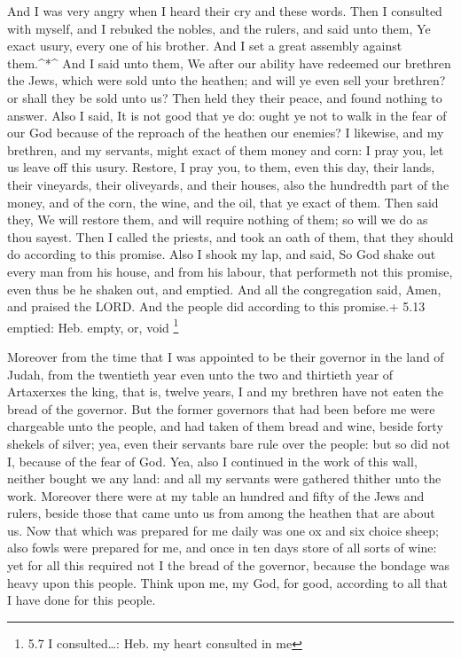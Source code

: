  And I was very angry when I heard their cry and these
words.  Then I consulted with myself, and I rebuked the
nobles, and the rulers, and said unto them, Ye exact usury, every one of
his brother. And I set a great assembly against them.\^{}*\^{}
 And I said unto them, We after our ability have redeemed
our brethren the Jews, which were sold unto the heathen; and will ye
even sell your brethren? or shall they be sold unto us? Then held they
their peace, and found nothing to answer.  Also I said, It
is not good that ye do: ought ye not to walk in the fear of our God
because of the reproach of the heathen our enemies?  I
likewise, and my brethren, and my servants, might exact of them money
and corn: I pray you, let us leave off this usury. 
Restore, I pray you, to them, even this day, their lands, their
vineyards, their oliveyards, and their houses, also the hundredth part
of the money, and of the corn, the wine, and the oil, that ye exact of
them.  Then said they, We will restore them, and will
require nothing of them; so will we do as thou sayest. Then I called the
priests, and took an oath of them, that they should do according to this
promise.  Also I shook my lap, and said, So God shake out
every man from his house, and from his labour, that performeth not this
promise, even thus be he shaken out, and emptied. And all the
congregation said, Amen, and praised the LORD. And the people did
according to this promise.+ 5.13 emptied: Heb. empty, or, void
\footnote{5.7 I consulted\ldots: Heb. my heart consulted in me}

 Moreover from the time that I was appointed to be their
governor in the land of Judah, from the twentieth year even unto the two
and thirtieth year of Artaxerxes the king, that is, twelve years, I and
my brethren have not eaten the bread of the governor.  But
the former governors that had been before me were chargeable unto the
people, and had taken of them bread and wine, beside forty shekels of
silver; yea, even their servants bare rule over the people: but so did
not I, because of the fear of God.  Yea, also I continued
in the work of this wall, neither bought we any land: and all my
servants were gathered thither unto the work.  Moreover
there were at my table an hundred and fifty of the Jews and rulers,
beside those that came unto us from among the heathen that are about us.
 Now that which was prepared for me daily was one ox and
six choice sheep; also fowls were prepared for me, and once in ten days
store of all sorts of wine: yet for all this required not I the bread of
the governor, because the bondage was heavy upon this people.
 Think upon me, my God, for good, according to all that I
have done for this people.

